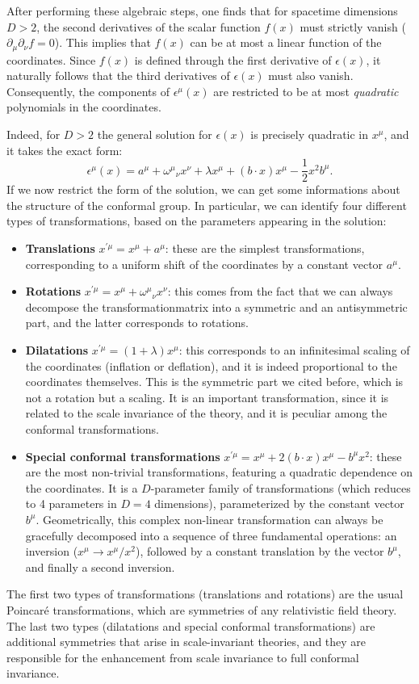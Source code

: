 After performing these algebraic steps, one finds that for spacetime dimensions \(D > 2\), the second derivatives of the scalar function \(f(x)\) must strictly vanish (\(\partial_\mu \partial_\nu f = 0\)). This implies that \(f(x)\) can be at most a linear function of the coordinates. Since \(f(x)\) is defined through the first derivative of \(\epsilon(x)\), it naturally follows that the third derivatives of \(\epsilon(x)\) must also vanish. Consequently, the components of \(\epsilon^\mu(x)\) are restricted to be at most \textit{quadratic} polynomials in the coordinates.

Indeed, for \(D>2\) the general solution for \(\epsilon(x)\) is precisely quadratic in \(x^{\mu}\), and it takes the exact form:
\[
    \epsilon^{\mu}(x)=a^{\mu}+{\omega^{\mu}}_{\nu}x^{\nu}+\lambda x^{\mu}+(b\cdot x)x^{\mu}-\frac{1}{2}x^{2}b^{\mu}.
\]
If we now restrict the form of the solution, we can get some informations about the structure of the conformal group. In particular, we can identify four different types of transformations, based on the parameters appearing in the solution:
\begin{itemize}
    \item \textbf{Translations} \(x^{\prime\mu}=x^{\mu}+a^{\mu}\): these are the simplest transformations, corresponding to a uniform shift of the coordinates by a constant vector \(a^{\mu}\).
    \item \textbf{Rotations} \(x^{\prime\mu}=x^{\mu}+{\omega^{\mu}}_{\nu}x^{\nu}\): this comes from the fact that we can always decompose the transformationmatrix into a symmetric and an antisymmetric part, and the latter corresponds to rotations.
    \item \textbf{Dilatations} \(x^{\prime\mu}=(1+\lambda)x^{\mu}\): this corresponds to an infinitesimal scaling of the coordinates (inflation or deflation), and it is indeed proportional to the coordinates themselves. This is the symmetric part we cited before, which is not a rotation but a scaling. It is an important transformation, since it is related to the scale invariance of the theory, and it is peculiar among the conformal transformations.
    \item \textbf{Special conformal transformations} \(x^{\prime\mu}=x^{\mu}+2(b\cdot x)x^{\mu}-b^{\mu}x^{2}\): these are the most non-trivial transformations, featuring a quadratic dependence on the coordinates. It is a \(D\)-parameter family of transformations (which reduces to 4 parameters in \(D=4\) dimensions), parameterized by the constant vector \(b^{\mu}\). Geometrically, this complex non-linear transformation can always be gracefully decomposed into a sequence of three fundamental operations: an inversion (\(x^{\mu} \rightarrow x^{\mu}/x^{2}\)), followed by a constant translation by the vector \(b^{\mu}\), and finally a second inversion.
\end{itemize}
The first two types of transformations (translations and rotations) are the usual Poincar\'e transformations, which are symmetries of any relativistic field theory. The last two types (dilatations and special conformal transformations) are additional symmetries that arise in scale-invariant theories, and they are responsible for the enhancement from scale invariance to full conformal invariance.

